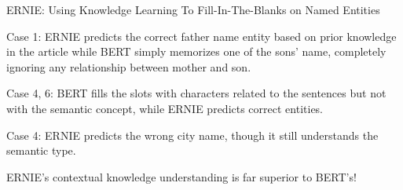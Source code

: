 \begin{frame}{ERNIE: Using Knowledge Learning To Fill-In-The-Blanks on Named Entities}
\begin{table}[htbp]
\begin{tableFont}
\begin{tabu}
        
        \hline 
    \end{tabu}
    
    \end{tableFont}
    
    
    \label{tbl:ernie_vs_bert_knowledgeLearningTask}
\end{table}
\vspace{-10pt}

\begin{itemizeSpaced}{0pt}
    \linespread{0.1}
    \item Case 1: ERNIE predicts the correct father name entity based on prior knowledge in the article while BERT simply memorizes one of the sons' name, completely ignoring any relationship between mother and son. 
    
    \item Case 4, 6: BERT fills the slots with characters related to the sentences but not with the semantic concept, while ERNIE predicts correct entities. 
    
    \item Case 4: ERNIE predicts the wrong city name, though it still understands the semantic type.
\end{itemizeSpaced}

ERNIE's contextual knowledge understanding is far superior to BERT's!
    
\end{frame}